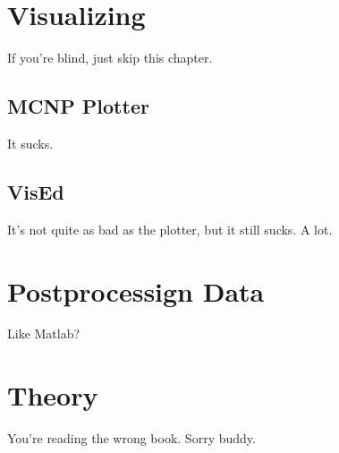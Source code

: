 \documentclass[10pt,a4paper]{book}
\begin{document}
\chapter{Visualizing}
If you're blind, just skip this chapter.

\section{MCNP Plotter}
It sucks.

\section{VisEd}
It's not quite as bad as the plotter, but it still sucks. A lot.

\chapter{Postprocessign Data}
Like Matlab?

\chapter{Theory}
You're reading the wrong book. Sorry buddy.
\end{document}
